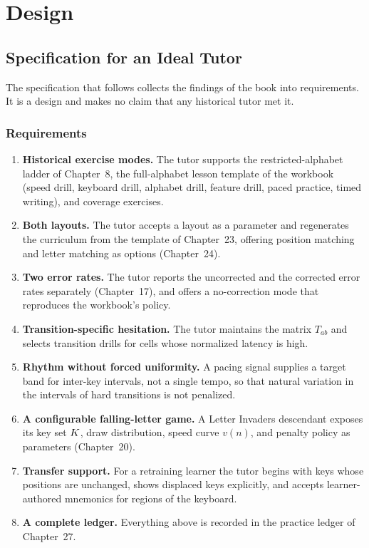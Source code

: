 \part{Design}

\chapter{Specification for an Ideal Tutor}

The specification that follows collects the findings of the book into requirements. It is a design and makes no claim that any historical tutor met it.

\section{Requirements}

\begin{enumerate}
\item \textbf{Historical exercise modes.} The tutor supports the restricted-alphabet ladder of Chapter~8, the full-alphabet lesson template of the workbook (speed drill, keyboard drill, alphabet drill, feature drill, paced practice, timed writing), and coverage exercises.
\item \textbf{Both layouts.} The tutor accepts a layout as a parameter and regenerates the curriculum from the template of Chapter~23, offering position matching and letter matching as options (Chapter~24).
\item \textbf{Two error rates.} The tutor reports the uncorrected and the corrected error rates separately (Chapter~17), and offers a no-correction mode that reproduces the workbook's policy.
\item \textbf{Transition-specific hesitation.} The tutor maintains the matrix $T_{ab}$ and selects transition drills for cells whose normalized latency is high.
\item \textbf{Rhythm without forced uniformity.} A pacing signal supplies a target band for inter-key intervals, not a single tempo, so that natural variation in the intervals of hard transitions is not penalized.
\item \textbf{A configurable falling-letter game.} A Letter Invaders descendant exposes its key set $K$, draw distribution, speed curve $v(n)$, and penalty policy as parameters (Chapter~20).
\item \textbf{Transfer support.} For a retraining learner the tutor begins with keys whose positions are unchanged, shows displaced keys explicitly, and accepts learner-authored mnemonics for regions of the keyboard.
\item \textbf{A complete ledger.} Everything above is recorded in the practice ledger of Chapter~27.
\end{enumerate}

